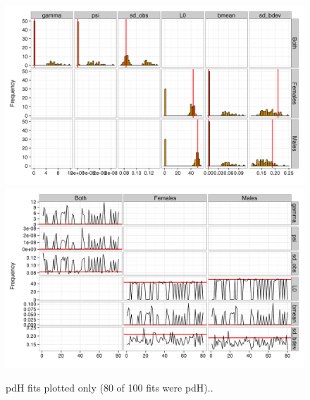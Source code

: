 \documentclass[11pt, a4paper]{article}
\begin{document}
\begin{figure}[!htbp]
  \centering
  \includegraphics[width=\linewidth]{../simulation/sims1/results/SimPars.png}
  \includegraphics[width=\linewidth]{../simulation/sims1/results/TracePars.png}
  \begin{quote}
    \caption{pdH fits plotted only (80 of 100 fits were pdH)..}
  \label{fig:}
  \end{quote}
\end{figure}


\newpage\clearpage
\end{document}
